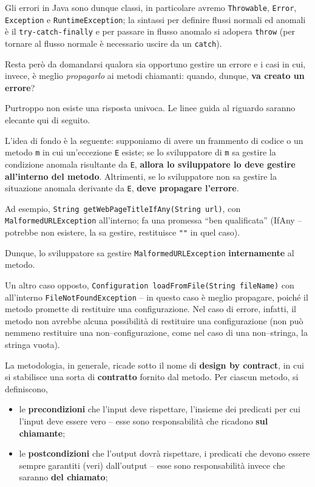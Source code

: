 \documentclass[\fontsizeclass,twocolumn]{\classname}
\theoremstyle{definition}
\theoremstyle{definition}
\begin{document}
Gli errori in Java sono dunque classi, in particolare avremo
\texttt{Throwable}, \texttt{Error}, \texttt{Exception} e
\texttt{Runtime\-Exception}; la sintassi per definire flussi normali ed anomali è
il \texttt{try\--catch-finally} e per passare in flusso anomalo si adopera
\texttt{throw} (per tornare al flusso normale è necessario uscire da un
\texttt{catch}).

Resta però da domandarsi qualora sia opportuno gestire un errore e i casi in
cui, invece, è meglio \emph{propagarlo} ai metodi chiamanti: quando, dunque,
\textbf{va creato un errore}?


Purtroppo non esiste una risposta univoca. Le linee guida al riguardo saranno
elecante qui di seguito.

L'idea di fondo è la seguente: supponiamo di avere un frammento di codice o un
metodo \texttt{m} in cui un'eccezione \texttt{E} esiste; se lo sviluppatore di
\texttt{m} sa gestire la condizione anomala risultante da \texttt{E},
\textbf{allora lo sviluppatore lo deve gestire all'interno del metodo}.
Altrimenti, se lo sviluppatore non sa gestire la situazione anomala derivante
da \texttt{E}, \textbf{deve propagare l'errore}.

Ad esempio, \texttt{String getWebPageTitleIfAny(String url)}, con
\texttt{MalformedURL\-Exception} all'interno; fa una promessa ``ben qualificata''
(IfAny -- potrebbe non esistere, la sa gestire, restituisce \texttt{""} in quel
caso).

Dunque, lo sviluppatore sa gestire \texttt{MalformedURL\-Exception}
\textbf{internamente} al metodo.

Un altro caso opposto, \texttt{Configuration loadFromFile(String fileName)} con
all'interno \texttt{FileNotFoundException} -- in questo caso è meglio
propagare, poiché il metodo promette di restituire una configurazione. Nel caso
di errore, infatti, il metodo non avrebbe alcuna possibilità di restituire una
configurazione (non può nemmeno restituire una non--configurazione, come nel
caso di una non--stringa, la stringa vuota).

La metodologia, in generale, ricade sotto il nome di \textbf{design by
contract}, in cui si stabilisce una sorta di \textbf{contratto} fornito dal
metodo. Per ciascun metodo, si definiscono,
\begin{itemize}
    \item le \textbf{precondizioni} che l'input deve rispettare, l'insieme dei
        predicati per cui l'input deve essere vero -- esse sono responsabilità
        che ricadono \textbf{sul chiamante};
    \item le \textbf{postcondizioni} che l'output dovrà rispettare, i predicati
        che devono essere sempre garantiti (veri) dall'output -- esse sono
        responsabilità invece che saranno \textbf{del chiamato};
\end{itemize}
\end{document}
